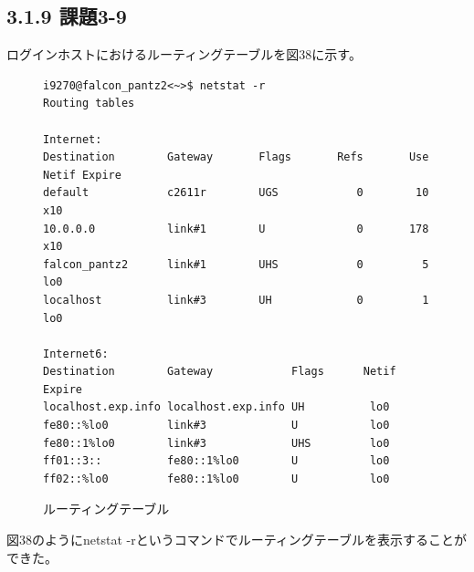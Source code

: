 \documentclass[12pt]{jreport}
\begin{document}
            \subsection*{3.1.9 課題3-9}
                ログインホストにおけるルーティングテーブルを図38に示す。
                \begin{figure}[H]
                    \begin{center}
                        \begin{screen}
                            \begin{verbatim}
i9270@falcon_pantz2<~>$ netstat -r
Routing tables

Internet:
Destination        Gateway       Flags       Refs       Use     Netif Expire
default            c2611r        UGS            0        10        x10
10.0.0.0           link#1        U              0       178        x10
falcon_pantz2      link#1        UHS            0         5        lo0
localhost          link#3        UH             0         1        lo0

Internet6:
Destination        Gateway            Flags      Netif Expire
localhost.exp.info localhost.exp.info UH          lo0
fe80::%lo0         link#3             U           lo0
fe80::1%lo0        link#3             UHS         lo0
ff01::3::          fe80::1%lo0        U           lo0
ff02::%lo0         fe80::1%lo0        U           lo0
                            \end{verbatim}
                        \end{screen}
                        \caption{ルーティングテーブル}
                        \label{38}
                    \end{center}
                \end{figure}
                図38のようにnetstat -rというコマンドでルーティングテーブルを表示することができた。
\end{document}
